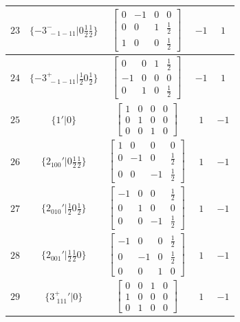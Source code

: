 \documentclass[fleqn,8pt]{jsarticle}
\begin{document}
\begin{longtable}{ccccc}
$ 23 $ & $ \{-3^{-}_{\,\,-1-11}|0 \frac{1}{2} \frac{1}{2}\} $ & $ \begin{bmatrix} 0 & -1 & 0 & 0 \\ 0 & 0 & 1 & \frac{1}{2} \\ 1 & 0 & 0 & \frac{1}{2} \end{bmatrix} $ & $ -1 $ & $ 1 $ \\ \hline
$ 24 $ & $ \{-3^{+}_{\,\,-1-11}|\frac{1}{2} 0 \frac{1}{2}\} $ & $ \begin{bmatrix} 0 & 0 & 1 & \frac{1}{2} \\ -1 & 0 & 0 & 0 \\ 0 & 1 & 0 & \frac{1}{2} \end{bmatrix} $ & $ -1 $ & $ 1 $ \\ \hline
$ 25 $ & $ \{1{}'|0\} $ & $ \begin{bmatrix} 1 & 0 & 0 & 0 \\ 0 & 1 & 0 & 0 \\ 0 & 0 & 1 & 0 \end{bmatrix} $ & $ 1 $ & $ -1 $ \\ \hline
$ 26 $ & $ \{2{}_{100}{}'|0 \frac{1}{2} \frac{1}{2}\} $ & $ \begin{bmatrix} 1 & 0 & 0 & 0 \\ 0 & -1 & 0 & \frac{1}{2} \\ 0 & 0 & -1 & \frac{1}{2} \end{bmatrix} $ & $ 1 $ & $ -1 $ \\ \hline
$ 27 $ & $ \{2{}_{010}{}'|\frac{1}{2} 0 \frac{1}{2}\} $ & $ \begin{bmatrix} -1 & 0 & 0 & \frac{1}{2} \\ 0 & 1 & 0 & 0 \\ 0 & 0 & -1 & \frac{1}{2} \end{bmatrix} $ & $ 1 $ & $ -1 $ \\ \hline
$ 28 $ & $ \{2{}_{001}{}'|\frac{1}{2} \frac{1}{2} 0\} $ & $ \begin{bmatrix} -1 & 0 & 0 & \frac{1}{2} \\ 0 & -1 & 0 & \frac{1}{2} \\ 0 & 0 & 1 & 0 \end{bmatrix} $ & $ 1 $ & $ -1 $ \\ \hline
$ 29 $ & $ \{3^{+}_{\,\,111}{}'|0\} $ & $ \begin{bmatrix} 0 & 0 & 1 & 0 \\ 1 & 0 & 0 & 0 \\ 0 & 1 & 0 & 0 \end{bmatrix} $ & $ 1 $ & $ -1 $ \\ \hline

\end{longtable}
\end{document}
